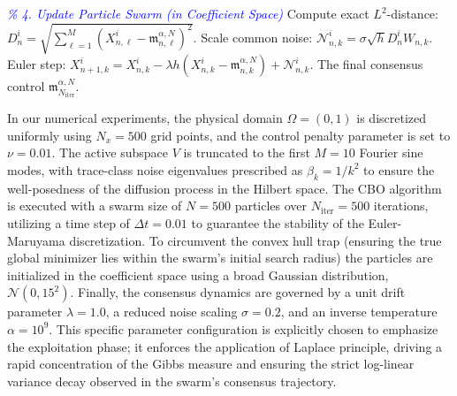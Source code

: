 \documentclass[12pt]{amsart}
\numberwithin{equation}{section}
\begin{document}
\begin{algorithm}[h]
\begin{algorithmic}[1]
    \STATE \textcolor{blue}{\textit{\% 4. Update Particle Swarm (in Coefficient Space)}}
        \STATE Compute exact $L^2$-distance: $D_n^i = \sqrt{ \sum_{\ell=1}^M (X_{n,\ell}^i - \mathfrak{m}_{n,\ell}^{\alpha, N})^2 }$.
            \STATE Scale common noise: $\mathcal{N}_{n,k}^i = \sigma \sqrt{h} D_n^i W_{n,k}$.
            \STATE Euler step: $X_{n+1,k}^i = X_{n,k}^i - \lambda h (X_{n,k}^i - \mathfrak{m}_{n,k}^{\alpha, N}) + \mathcal{N}_{n,k}^i$.
        \ENDFOR
    \ENDFOR
\ENDFOR
\vspace{0.1cm}
\ENSURE The final consensus control $\mathfrak{m}_{N_{\text{iter}}}^{\alpha, N}$.
\end{algorithmic}
\end{algorithm}



In our numerical experiments, the physical domain $\Omega = (0,1)$ is discretized uniformly using $N_x = 500$ grid points, and the control penalty parameter is set to $\nu = 0.01$. The active subspace $V$ is truncated to the first $M = 10$ Fourier sine modes, with trace-class noise eigenvalues prescribed as $\beta_k = 1/k^2$ to ensure the well-posedness of the diffusion process in the Hilbert space. The CBO algorithm is executed with a swarm size of $N = 500$ particles over $N_{\text{iter}} = 500$ iterations, utilizing a time step of $\Delta t = 0.01$ to guarantee the stability of the Euler-Maruyama discretization. To circumvent the convex hull trap (ensuring the true global minimizer lies within the swarm's initial search radius) the particles are initialized in the coefficient space using a broad Gaussian distribution, $\mathcal{N}(0, 15^2)$. Finally, the consensus dynamics are governed by a unit drift parameter $\lambda = 1.0$, a reduced noise scaling $\sigma = 0.2$, and an inverse temperature $\alpha = 10^9$. This specific parameter configuration is explicitly chosen to emphasize the exploitation phase; it enforces the application of Laplace principle, driving a rapid concentration of the Gibbs measure and ensuring the strict log-linear variance decay observed in the swarm's consensus trajectory.
\end{document}

